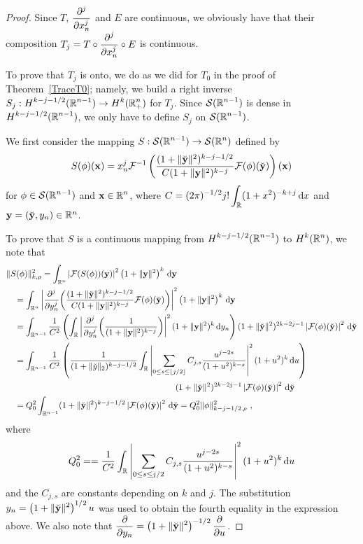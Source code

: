 \begin{proof}
Since $T$, $\displaystyle \frac{\displaystyle \partial^{j}{}} {\displaystyle \partial x_n^{j}}$ and $E$ are continuous,
we obviously have that their composition
$\displaystyle T_j = T \circ \frac{\displaystyle \partial^{j}{}} {\displaystyle \partial x_n^{j}} \circ E$ is continuous.

To prove that $T_j$ is onto, we do as we did for $T_0$ in the proof
of Theorem~\ref{TraceT0}; namely, we build a right inverse
$\displaystyle S_j : H^{k-j-1/2}(\mathbb{R}^{n-1}) \to H^k(\mathbb{R}^n_+)$ for $T_j$.
Since $\displaystyle \mathcal{S}(\mathbb{R}^{n-1})$ is dense in
$\displaystyle H^{k-j-1/2}(\mathbb{R}^{n-1})$,
we only have to define $S_j$ on $\displaystyle \mathcal{S}(\mathbb{R}^{n-1})$.

We first consider the mapping $\displaystyle S:\mathcal{S}(\mathbb{R}^{n-1}) \to \mathcal{S}(\mathbb{R}^n)$
defined by
\[
S(\phi)(\mathbf{x}) = x_n^j \mathcal{F}^{-1}\left(
\frac{(1+\|\breve{\mathbf{y}}\|^2)^{k-j-1/2}}{C (1+ \|\mathbf{y}\|^2)^{k-j}}
\mathcal{F}(\phi)(\breve{\mathbf{y}}) \right)(\mathbf{x})
\]
for $\displaystyle \phi \in \mathcal{S}(\mathbb{R}^{n-1})$ and
$\displaystyle \mathbf{x} \in \mathbb{R}^n$, where
$\displaystyle C = (2\pi)^{-1/2} j! \int_{\mathbb{R}} (1+x^2)^{-k+j}\,\mathrm{d}{x}$ and
$\mathbf{y} = (\breve{\mathbf{y}},y_n) \in \mathbb{R}^n$.

To prove that $S$ is a continuous mapping from
$\displaystyle H^{k-j-1/2}(\mathbb{R}^{n-1})$ to $\displaystyle H^k(\mathbb{R}^n)$, we
note that
\begin{align*}
&\|S(\phi)\|_{k,\rho}^2
= \int_{\RR^n} \left| \F(S(\phi))(\VEC{y}) \right|^2 \left( 1 + \|\VEC{y}\|^2\right)^k
\dx{\VEC{y}} \\
&\quad = \int_{\RR^n} \left|\pdfdxn{\left(
\frac{(1+\|\breve{\VEC{y}}\|^2)^{k-j-1/2}}{C (1+ \|\VEC{y}\|^2)^{k-j}}
\F(\phi)(\breve{\VEC{y}}) \right)}{y_n}{j} \right|^2
\left( 1 + \|\VEC{y}\|^2\right)^k \dx{\VEC{y}} \\
&\quad = \int_{\RR^{n-1}} \frac{1}{C^2} \left( \int_{\RR}
\left| \pdfdxn{\left( \frac{1}{(1+ \|\VEC{y}\|^2)^{k-j}}
  \right)}{y_n}{j} \right|^2 (1 + \|\VEC{y}\|^2)^k  \dx{y_n} \right)
(1+\|\breve{\VEC{y}}\|^2)^{2k-2j-1} \left| \F(\phi)(\breve{\VEC{y}}) \right|^2
  \dx{\breve{\VEC{y}}} \\
&\quad = \int_{\RR^{n-1}} \frac{1}{C^2} \left( \frac{1}{(1+\|\breve{y}\|_2)^{k-j-1/2}}
\int_{\RR} \left| \sum_{0 \leq s \leq \intpt{j/2}}
C_{j,s} \frac{u^{j-2s}}{(1+u^2)^{k-s}} \right|^2 (1 + u^2)^k \dx{u} \right) \\
&\hspace{20em} (1+\|\breve{\VEC{y}}\|^2)^{2k-2j-1} 
  \left|\F(\phi)(\breve{\VEC{y}}) \right|^2 \dx{\breve{\VEC{y}}} \\
&\quad = Q_0^2  \int_{\RR^{n-1}}
(1+\|\breve{\VEC{y}}\|^2)^{k-j-1/2} \left| \F(\phi)(\breve{\VEC{y}}) \right|^2
  \dx{\breve{\VEC{y}}} = Q_0^2 \|\phi\|_{k-j-1/2.\rho}^2 \ ,
\end{align*}
where
\[
Q_0^2 =  = \frac{1}{C^2} \int_{\mathbb{R}} \left| \sum_{0 \leq s \leq j/2}
C_{j,s} \frac{u^{j-2s}}{(1+u^2)^{k-s}} \right|^2 (1 + u^2)^k \,\mathrm{d}{u}
\]
and the $C_{j,s}$ are constants depending on $k$ and $j$.
The substitution
$\displaystyle y_n = \left(1 + \|\breve{\mathbf{y}}\|^2\right)^{1/2} u$
was used to obtain the fourth equality in the expression above.  We
also note that $\displaystyle \frac{\partial{}}{\partial y_n} =
\left(1 + \|\breve{\mathbf{y}}\|^2\right)^{-1/2} \frac{\partial{}}{\partial u}$.


\end{proof}

